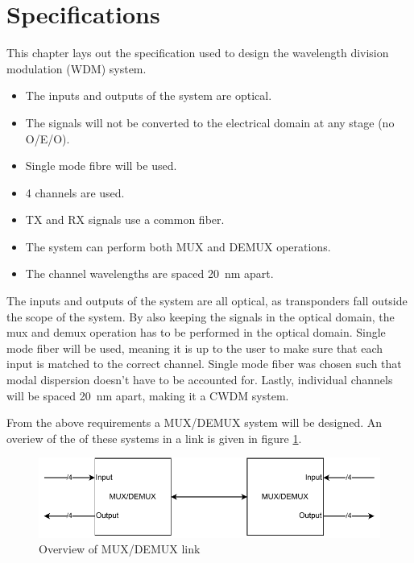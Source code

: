 \section{Specifications}
\label{sec:specifications}
This chapter lays out the specification used to design the wavelength division modulation (WDM) system.

\begin{itemize}
 \item The inputs and outputs of the system are optical.
 \item The signals will not be converted to the electrical domain at any stage (no O/E/O). 
 \item Single mode fibre will be used.
 \item 4 channels are used.
 \item TX and RX signals use a common fiber.
 \item The system can perform both MUX and DEMUX operations.
 \item The channel wavelengths are spaced \qty{20}{\nm} apart.
\end{itemize}

The inputs and outputs of the system are all optical, as transponders fall outside the 
scope of the system. By also keeping the signals in the optical domain, the mux and demux 
operation has to be performed in the optical domain. Single mode fiber will be used, 
meaning it is up to the user to make sure that each input is matched to the correct channel. 
Single mode fiber was chosen such that modal dispersion doesn't have to be accounted for. 
Lastly, individual channels will be spaced \qty{20}{\nm} apart, making it a CWDM system.

From the above requirements a MUX/DEMUX system will be designed. An overiew of the of these 
systems in a link is given in figure \ref{fig:link_overview}.

\begin{figure}[ht]
    \includegraphics[width=\linewidth]{images/link_overview.pdf}
    \caption{Overview of MUX/DEMUX link}
    \label{fig:link_overview}
\end{figure}